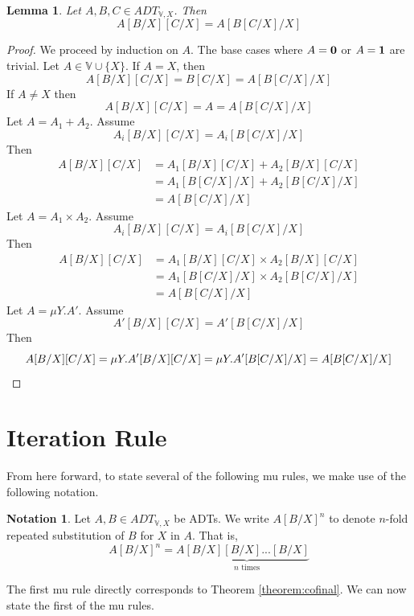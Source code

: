 \documentclass{msthesis}
\newtheorem{lemma}[theorem]{Lemma}
\theoremstyle{definition}
\newtheorem*{notation}{Notation}
\newcommand{\vars}{\mathbb{V}}
\begin{document}
\begin{lemma}\label{lemma:doublesub}
    Let $A, B, C \in ADT_{\vars, X}$. Then
    \[ A[B/X][C/X] = A[B[C/X]/X] \]
\end{lemma}
\begin{proof}
    We proceed by induction on $A$.
    The base cases where $A = \mathbf{0}$ or $A = \mathbf{1}$ are trivial.
    Let $A \in \vars \cup \{X\}$.
    If $A = X$, then
    \[ A[B/X][C/X] = B[C/X] = A[B[C/X]/X] \]
    If $A \neq X$ then
    \[ A[B/X][C/X] = A = A[B[C/X]/X] \]
    Let $A = A_1 + A_2$.  Assume 
    \[ A_i[B/X][C/X] = A_i[B[C/X]/X] \]
    Then
    \begin{align*}
        A[B/X][C/X] &= A_1[B/X][C/X] + A_2[B/X][C/X] \\
        &= A_1[B[C/X]/X] + A_2[B[C/X]/X] \\
        &= A[B[C/X]/X]
    \end{align*}
    Let $A = A_1 \times A_2$.  Assume 
    \[ A_i[B/X][C/X] = A_i[B[C/X]/X] \]
    Then
    \begin{align*}
        A[B/X][C/X] &= A_1[B/X][C/X] \times A_2[B/X][C/X] \\
        &= A_1[B[C/X]/X] \times A_2[B[C/X]/X] \\
        &= A[B[C/X]/X]
    \end{align*}
    Let $A = \mu Y.A'$.  Assume
    \[ A'[B/X][C/X] = A'[B[C/X]/X] \]
    Then
    \[ A[B/X][C/X] = \mu Y.A'[B/X][C/X] = \mu Y.A'[B[C/X]/X] = A[B[C/X]/X] \qedhere \]
\end{proof}

\section{Iteration Rule}

From here forward, to state several of the following mu rules, we make use of the following notation.

\begin{notation}
    Let $A, B \in ADT_{\vars, X}$ be ADTs.  We write
    $A[B/X]^n$ to denote $n$-fold repeated substitution of $B$ for $X$ in $A$.  That is,
    \[ A[B/X]^n = A\underbrace{[B/X][B/X]...[B/X]}_{\text{$n$ times}} \]
\end{notation}

The first mu rule directly corresponds to Theorem \ref{theorem:cofinal}. We can now state the first of the mu rules.
\end{document}
